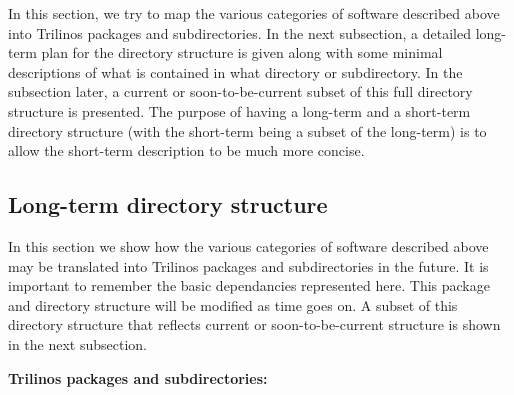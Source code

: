 \documentclass[pdf,ps2pdf,11pt]{SANDreport}
\begin{document}
In this section, we try to map the various categories of software described
above into Trilinos packages and subdirectories.  In the next subsection, a
detailed long-term plan for the directory structure is given along with some
minimal descriptions of what is contained in what directory or subdirectory.
In the subsection later, a current or soon-to-be-current subset of this full
directory structure is presented.  The purpose of having a long-term and a
short-term directory structure (with the short-term being a subset of the
long-term) is to allow the short-term description to be much more concise.

%
\subsection{Long-term directory structure}
%

In this section we show how the various categories of software described above
may be translated into Trilinos packages and subdirectories in the future.  It
is important to remember the basic dependancies represented here.  This
package and directory structure will be modified as time goes on.  A subset of
this directory structure that reflects current or soon-to-be-current structure
is shown in the next subsection.

\noindent{}\textbf{Trilinos packages and subdirectories:}
%
\end{document}
